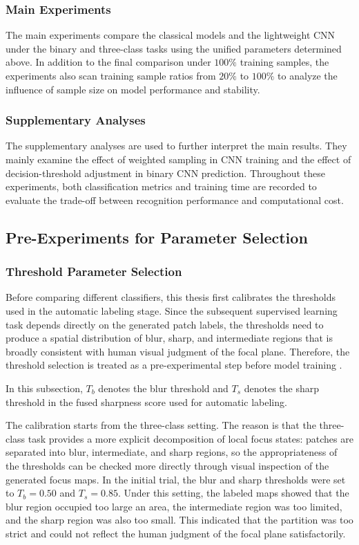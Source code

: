 \subsubsection{Main Experiments}
\par The main experiments compare the classical models and the lightweight CNN
under the binary and three-class tasks using the unified parameters determined
above. In addition to the final comparison under $100\%$ training samples, the
experiments also scan training sample ratios from $20\%$ to $100\%$ to analyze
the influence of sample size on model performance and stability.

\subsubsection{Supplementary Analyses}
\par The supplementary analyses are used to further interpret the main results.
They mainly examine the effect of weighted sampling in CNN training and the
effect of decision-threshold adjustment in binary CNN prediction. Throughout
these experiments, both classification metrics and training time are recorded to
evaluate the trade-off between recognition performance and computational cost.

\subsection{Pre-Experiments for Parameter Selection}
\subsubsection{Threshold Parameter Selection}
\par Before comparing different classifiers, this thesis first calibrates the
thresholds used in the automatic labeling stage. Since the subsequent supervised
learning task depends directly on the generated patch labels, the thresholds
need to produce a spatial distribution of blur, sharp, and intermediate regions
that is broadly consistent with human visual judgment of the focal plane.
Therefore, the threshold selection is treated as a pre-experimental step before
model training \cite{5739529,1284395}.

\par In this subsection, $T_b$ denotes the blur threshold and $T_s$ denotes the
sharp threshold in the fused sharpness score used for automatic labeling.

\par The calibration starts from the three-class setting. The reason is that the
three-class task provides a more explicit decomposition of local focus states:
patches are separated into blur, intermediate, and sharp regions, so the
appropriateness of the thresholds can be checked more directly through visual
inspection of the generated focus maps. In the initial trial, the blur and sharp
thresholds were set to $T_b=0.50$ and $T_s=0.85$. Under this setting, the
labeled maps showed that the blur region occupied too large an area, the
intermediate region was too limited, and the sharp region was also too small.
This indicated that the partition was too strict and could not reflect the human
judgment of the focal plane satisfactorily.

